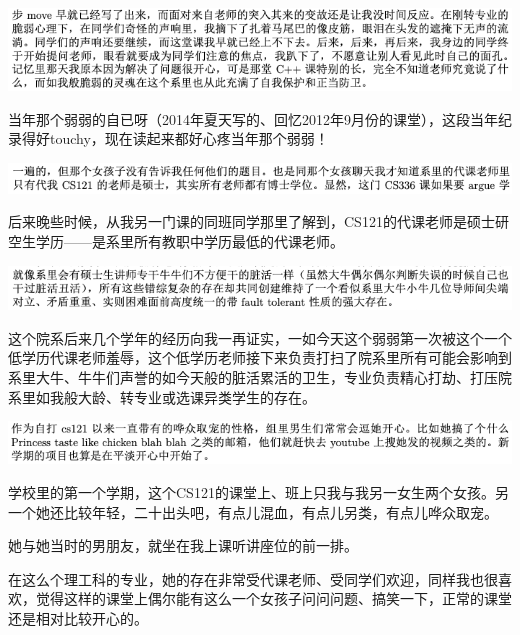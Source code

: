 \documentclass[9pt, b5paper]{article}
\begin{document}
\begin{center}
\includegraphics[width=.9\linewidth]{./pic/backups_plans_20210424_203612.png}
\end{center}

当年那个弱弱的自已呀（2014年夏天写的、回忆2012年9月份的课堂），这段当年纪录得好touchy，现在读起来都好心疼当年那个弱弱！

\begin{center}
\includegraphics[width=.9\linewidth]{./pic/backups_plans_20210424_210229.png}
\end{center}

后来晚些时候，从我另一门课的同班同学那里了解到，CS121的代课老师是硕士研空生学历——是系里所有教职中学历最低的代课老师。

\begin{center}
\includegraphics[width=.9\linewidth]{./pic/backups_plans_20210424_155915.png}
\end{center}

这个院系后来几个学年的经历向我一再证实，一如今天这个弱弱第一次被这个一个低学历代课老师羞辱，这个低学历老师接下来负责打扫了院系里所有可能会影响到系里大牛、牛牛们声誉的如今天般的脏活累活的卫生，专业负责精心打劫、打压院系里如我般大龄、转专业或选课异类学生的存在。


\begin{center}
\includegraphics[width=.9\linewidth]{./pic/backups_plans_20210424_160112.png}
\end{center}

学校里的第一个学期，这个CS121的课堂上、班上只我与我另一女生两个女孩。另一个她还比较年轻，二十出头吧，有点儿混血，有点儿另类，有点儿哗众取宠。

她与她当时的男朋友，就坐在我上课听讲座位的前一排。

在这么个理工科的专业，她的存在非常受代课老师、受同学们欢迎，同样我也很喜欢，觉得这样的课堂上偶尔能有这么一个女孩子问问问题、搞笑一下，正常的课堂还是相对比较开心的。 
\end{document}
